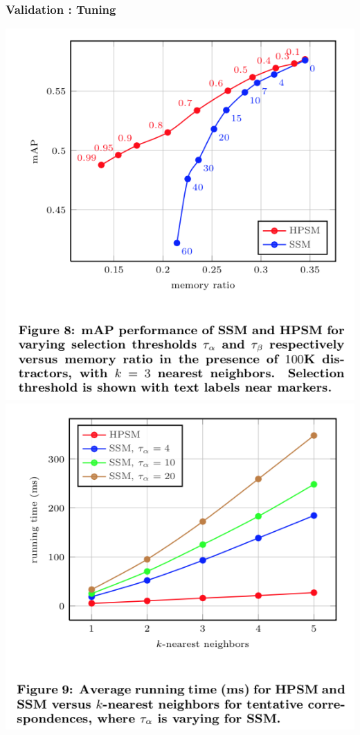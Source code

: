 \documentclass[11pt]{beamer}
\begin{document}
\begin{frame}
\frametitle{Validation : Tuning}
\begin{center}
\includegraphics[scale=0.48]{figure8}
\hspace{0.4cm}
\includegraphics[scale=0.55]{figure9}
\end{center}
\end{frame}
\end{document}
